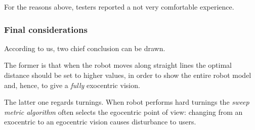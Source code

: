 %
For the reasons above, testers reported a not very comfortable experience.
%
\subsubsection{Final considerations}
\label{subsubsec:finalconsiderations}
According to us, two chief conclusion can be drawn.
%

%
The former is that when the robot moves along straight lines
the optimal distance should be set to higher values, in order
to show the entire robot model and, hence, to give a \textit{fully}
exocentric vision.
%

%
The latter one regards turnings. When robot performs hard turnings
the \textit{sweep metric algorithm} often selects the egocentric
point of view: changing from an exocentric to an egocentric vision
causes disturbance to users.
